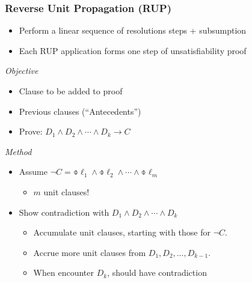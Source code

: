 \documentclass[t,pdf]{beamer}
\begin{document}
\begin{frame}
  \frametitle{Reverse Unit Propagation (RUP)}

  \begin{itemize}
  \item Perform a linear sequence of resolutions steps + subsumption
  \item Each RUP application forms one step of unsatisfiability proof
  \end{itemize}

  {\em Objective}
  \begin{itemize}
    \item {} Clause to be added to proof
    \item {} Previous clauses (``Antecedents'')
    \item Prove: $D_1 \land D_2 \land \cdots \land D_k \rightarrow C$ 
  \end{itemize}
{\em Method}
\begin{itemize}
\item Assume $\neg C = \obar{\ell}_1 \land \obar{\ell}_2 \land \cdots \land \obar{\ell}_m$
  \begin{itemize}
    \item $m$ unit clauses!
  \end{itemize}
\item Show contradiction with $D_1 \land D_2 \land \cdots \land D_k$ 
  \begin{itemize}
  \item Accumulate unit clauses, starting with those for $\neg C$.
  \item Accrue more unit clauses from $D_1, D_2, \ldots, D_{k-1}$.
  \item When encounter $D_k$, should have contradiction
  \end{itemize}
\end{itemize}

\end{frame}
\end{document}
